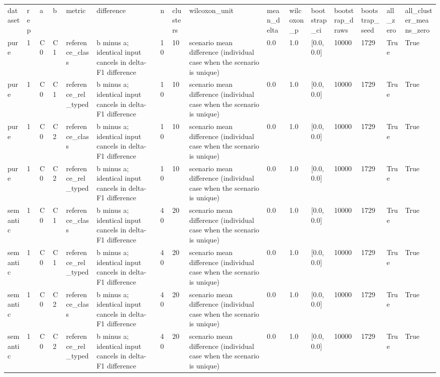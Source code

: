 \begin{tabular}{llllllllllllllll}
dataset & rep & a & b & metric & difference & n & clusters & wilcoxon\_unit & mean\_delta & wilcoxon\_p & bootstrap\_ci & bootstrap\_draws & bootstrap\_seed & all\_zero & all\_cluster\_means\_zero \\
pure & 1 & C0 & C1 & reference\_class & b minus a; identical input cancels in delta-F1 difference & 10 & 10 & scenario mean difference (individual case when the scenario is unique) & 0.0 & 1.0 & [0.0, 0.0] & 10000 & 1729 & True & True \\
pure & 1 & C0 & C1 & reference\_rel\_typed & b minus a; identical input cancels in delta-F1 difference & 10 & 10 & scenario mean difference (individual case when the scenario is unique) & 0.0 & 1.0 & [0.0, 0.0] & 10000 & 1729 & True & True \\
pure & 1 & C0 & C2 & reference\_class & b minus a; identical input cancels in delta-F1 difference & 10 & 10 & scenario mean difference (individual case when the scenario is unique) & 0.0 & 1.0 & [0.0, 0.0] & 10000 & 1729 & True & True \\
pure & 1 & C0 & C2 & reference\_rel\_typed & b minus a; identical input cancels in delta-F1 difference & 10 & 10 & scenario mean difference (individual case when the scenario is unique) & 0.0 & 1.0 & [0.0, 0.0] & 10000 & 1729 & True & True \\
semantic & 1 & C0 & C1 & reference\_class & b minus a; identical input cancels in delta-F1 difference & 40 & 20 & scenario mean difference (individual case when the scenario is unique) & 0.0 & 1.0 & [0.0, 0.0] & 10000 & 1729 & True & True \\
semantic & 1 & C0 & C1 & reference\_rel\_typed & b minus a; identical input cancels in delta-F1 difference & 40 & 20 & scenario mean difference (individual case when the scenario is unique) & 0.0 & 1.0 & [0.0, 0.0] & 10000 & 1729 & True & True \\
semantic & 1 & C0 & C2 & reference\_class & b minus a; identical input cancels in delta-F1 difference & 40 & 20 & scenario mean difference (individual case when the scenario is unique) & 0.0 & 1.0 & [0.0, 0.0] & 10000 & 1729 & True & True \\
semantic & 1 & C0 & C2 & reference\_rel\_typed & b minus a; identical input cancels in delta-F1 difference & 40 & 20 & scenario mean difference (individual case when the scenario is unique) & 0.0 & 1.0 & [0.0, 0.0] & 10000 & 1729 & True & True \\
\end{tabular}